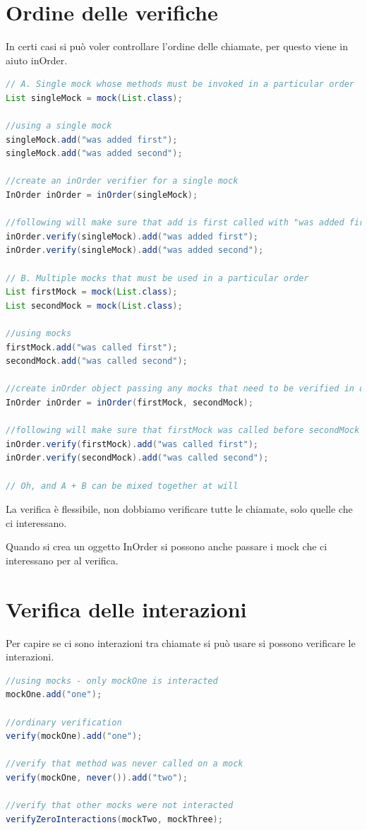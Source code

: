 \documentclass[11pt,a4paper]{book}
\begin{document}
\section{Ordine delle verifiche}
In certi casi si può voler controllare l'ordine delle chiamate, per questo viene in aiuto inOrder.
\begin{lstlisting}[language = Java]
// A. Single mock whose methods must be invoked in a particular order
List singleMock = mock(List.class);

//using a single mock
singleMock.add("was added first");
singleMock.add("was added second");

//create an inOrder verifier for a single mock
InOrder inOrder = inOrder(singleMock);

//following will make sure that add is first called with "was added first", then with "was added second"
inOrder.verify(singleMock).add("was added first");
inOrder.verify(singleMock).add("was added second");

// B. Multiple mocks that must be used in a particular order
List firstMock = mock(List.class);
List secondMock = mock(List.class);

//using mocks
firstMock.add("was called first");
secondMock.add("was called second");

//create inOrder object passing any mocks that need to be verified in order
InOrder inOrder = inOrder(firstMock, secondMock);

//following will make sure that firstMock was called before secondMock
inOrder.verify(firstMock).add("was called first");
inOrder.verify(secondMock).add("was called second");

// Oh, and A + B can be mixed together at will
\end{lstlisting}
La verifica è flessibile, non dobbiamo verificare tutte le chiamate, solo quelle che ci interessano.

Quando si crea un oggetto InOrder si possono anche passare i mock che ci interessano per al verifica.

\section{Verifica delle interazioni}
Per capire se ci sono interazioni tra chiamate si può usare si possono verificare le interazioni.
\begin{lstlisting}[language = Java]
//using mocks - only mockOne is interacted
mockOne.add("one");

//ordinary verification
verify(mockOne).add("one");

//verify that method was never called on a mock
verify(mockOne, never()).add("two");

//verify that other mocks were not interacted
verifyZeroInteractions(mockTwo, mockThree);
\end{lstlisting}
\end{document}

